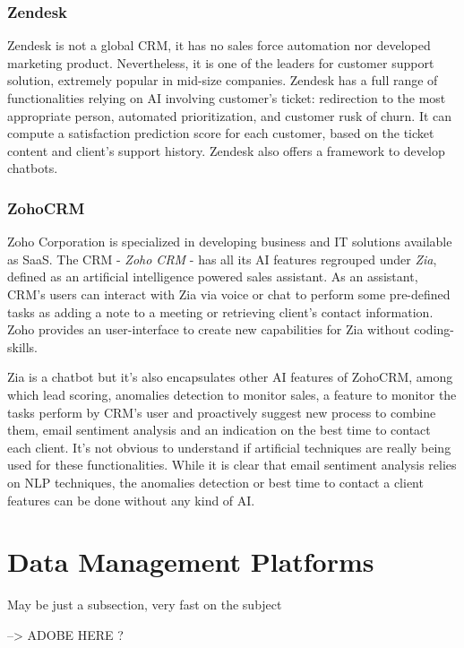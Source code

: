 \subsubsection*{Zendesk}
Zendesk is not a global CRM, it has no sales force automation nor developed marketing product. Nevertheless, it is one of the leaders for customer support solution, extremely popular in mid-size companies. Zendesk has a full range of functionalities relying on AI involving customer's ticket: redirection to the most appropriate person, automated prioritization, and customer rusk of churn. It can compute a satisfaction prediction score for each customer, based on the ticket content and client's support history. Zendesk also offers a framework to develop chatbots.

\subsubsection*{ZohoCRM}
Zoho Corporation is specialized in developing business and IT solutions available as SaaS. The CRM - \textit{Zoho CRM} - has all its AI features regrouped under \textit{Zia}, defined as an artificial intelligence powered sales assistant.
As an assistant, CRM's users can interact with Zia via voice or chat to perform some pre-defined tasks as adding a note to a meeting or retrieving client's contact information. Zoho provides an user-interface to create new capabilities for Zia without coding-skills.

Zia is a chatbot but it's also encapsulates other AI features of ZohoCRM, among which lead scoring, anomalies detection to monitor sales, a feature to monitor the tasks perform by CRM's user and proactively suggest new process to combine them, email sentiment analysis and an indication on the best time to contact each client. It's not obvious to understand if artificial techniques are really being used for these functionalities. While it is clear that email sentiment analysis relies on NLP techniques, the anomalies detection or best time to contact a client features can be done without any kind of AI.

\section{Data Management Platforms}
May be just a subsection, very fast on the subject

--> ADOBE HERE ?


